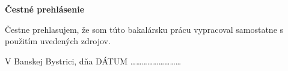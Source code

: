 \null
\vfill

\textbf{Čestné prehlásenie}

Čestne prehlasujem, že som túto bakalársku prácu vypracoval samostatne s použitím
uvedených zdrojov.

\begin{multicols}{2}
V Banskej Bystrici, dňa DÁTUM
\columnbreak
\flushright \ldots \ldots \ldots \ldots \ldots \ldots \ldots \ldots \ldots
\end{multicols}

\thispagestyle{empty}